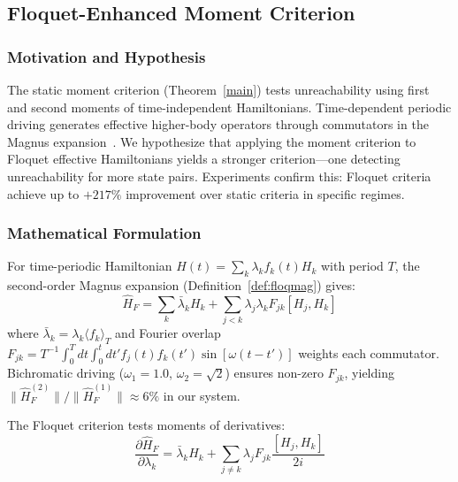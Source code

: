 
\subsection{Floquet-Enhanced Moment Criterion}
\label{sec:floquet_results}

\subsubsection{Motivation and Hypothesis}

The static moment criterion (Theorem~\ref{main}) tests unreachability using first and second moments of time-independent Hamiltonians. Time-dependent periodic driving generates effective higher-body operators through commutators in the Magnus expansion~\cite{Goldman_2014}. We hypothesize that applying the moment criterion to Floquet effective Hamiltonians yields a stronger criterion—one detecting unreachability for more state pairs. Experiments confirm this: Floquet criteria achieve up to $+217\%$ improvement over static criteria in specific regimes.

\subsubsection{Mathematical Formulation}

For time-periodic Hamiltonian $H(t) = \sum_k \lambda_k f_k(t) H_k$ with period $T$, the second-order Magnus expansion (Definition~\ref{def:floqmag}) gives:
\begin{equation}
\hat{H}_F = \sum_k \bar{\lambda}_k H_k + \sum_{j<k} \lambda_j \lambda_k F_{jk} [H_j, H_k]
\label{eq:floquet_magnus}
\end{equation}
where $\bar{\lambda}_k = \lambda_k \langle f_k \rangle_T$ and Fourier overlap $F_{jk} = T^{-1} \int_0^T dt \int_0^t dt' f_j(t) f_k(t') \sin[\omega(t-t')]$ weights each commutator. Bichromatic driving ($\omega_1 = 1.0$, $\omega_2 = \sqrt{2}$) ensures non-zero $F_{jk}$, yielding $\|\hat{H}_F^{(2)}\| / \|\hat{H}_F^{(1)}\| \approx 6\%$ in our system.

The Floquet criterion tests moments of derivatives:
\begin{equation}
\frac{\partial \hat{H}_F}{\partial \lambda_k} = \bar{\lambda}_k H_k + \sum_{j \neq k} \lambda_j F_{jk} \frac{[H_j, H_k]}{2i}
\label{eq:floquet_derivative}
\end{equation}


